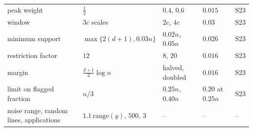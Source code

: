 \begin{table}[htbp]
{\begin{tabular}{lllll}
peak weight & $\tfrac12$ & $0.4$, $0.6$ & $0.015$ & S23 \\
window & $3c$ scales & $2c$, $4c$ & $0.03$ & S23 \\
minimum support & $\max\{2(d+1),0.03n\}$ & $0.02n$, $0.05n$ & $0.026$ & S23 \\
restriction factor & $12$ & $8$, $20$ & $0.016$ & S23 \\
margin & $\tfrac{d+1}{2}\log n$ & halved, doubled & $0.016$ & S23 \\
limit on flagged fraction & $n/3$ & $0.25n$, $0.40n$ & $0.20$ at $0.25n$ & S23 \\
noise range, random lines, applications & $1.1\,\mathrm{range}(y)$, $500$, $3$ & -- & -- & -- \\
\bottomrule
\end{tabular}}
\end{table}

\begin{table}[htbp]
\centering
\footnotesize
\caption{Criteria that count flagged or trimmed clean units (descriptive; Section~4.1 of the
paper), over the same $123$ cells as Table~2 of the paper: the adjusted Rand index on all units,
with the outliers as a class of their own and every flagged or trimmed unit labelled as an
outlier, and the misclassification rate of the clean units, counting a flagged clean unit as an
error (the labels matched to the true groups by the best permutation). Flags are those of the
reweighting rule ($c=2.5$), with the covariate screen for ESF and without it for TCLUST-REG.
Mean over cells of the cell means, and the worst cell. rw: the reweighting step; recovery:
followed by the recovery step.}
\label{tab:S45}
\resizebox{\textwidth}{!}{}
\end{table}

\begin{table}[htbp]
\centering
\footnotesize
\caption{The recovery step after the trimmed cluster-weighted model (descriptive;
Section~4.6 of the paper): mean over cells of the mean accuracy on clean units, the number of
cells with a mean below $0.85$, and the worst cell, over the same $123$ cells as Table~2 of the
paper. The model is fitted by RobMixReg at levels $0.25$ and $0.40$ ($50$ starts), then
reweighted by our rule (rw) and followed by the recovery step.}
\label{tab:S46}
\resizebox{\textwidth}{!}{}
\end{table}

